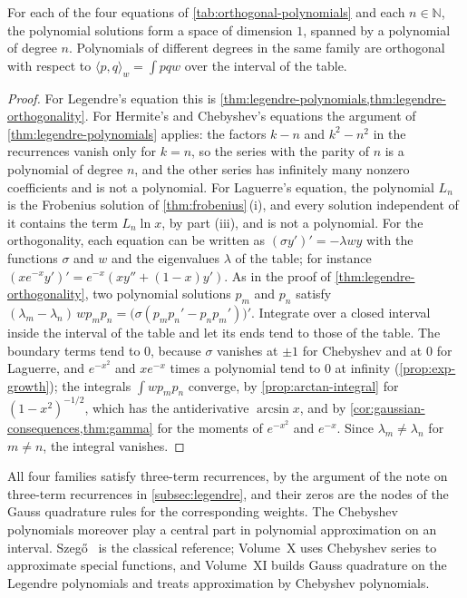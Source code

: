 \begin{proposition}
\label{prop:classical-polynomials}
For each of the four equations of \cref{tab:orthogonal-polynomials} and each $n\in\mathbb N$, the polynomial solutions form a space of dimension $1$, spanned by a polynomial of degree $n$. Polynomials of different degrees in the same family are orthogonal with respect to $\langle p,q\rangle_w=\int pqw$ over the interval of the table.
\end{proposition}

\begin{proof}
For Legendre's equation this is \cref{thm:legendre-polynomials,thm:legendre-orthogonality}. For Hermite's and Chebyshev's equations the argument of \cref{thm:legendre-polynomials} applies: the factors $k-n$ and $k^2-n^2$ in the recurrences vanish only for $k=n$, so the series with the parity of $n$ is a polynomial of degree $n$, and the other series has infinitely many nonzero coefficients and is not a polynomial. For Laguerre's equation, the polynomial $L_n$ is the Frobenius solution of \cref{thm:frobenius}\,(i), and every solution independent of it contains the term $L_n\ln x$, by part (iii), and is not a polynomial. For the orthogonality, each equation can be written as $(\sigma y')'=-\lambda wy$ with the functions $\sigma$ and $w$ and the eigenvalues $\lambda$ of the table; for instance $(xe^{-x}y')'=e^{-x}(xy''+(1-x)y')$. As in the proof of \cref{thm:legendre-orthogonality}, two polynomial solutions $p_m$ and $p_n$ satisfy $(\lambda_m-\lambda_n)\,wp_mp_n=\bigl(\sigma(p_mp_n'-p_np_m')\bigr)'$. Integrate over a closed interval inside the interval of the table and let its ends tend to those of the table. The boundary terms tend to $0$, because $\sigma$ vanishes at $\pm1$ for Chebyshev and at $0$ for Laguerre, and $e^{-x^2}$ and $xe^{-x}$ times a polynomial tend to $0$ at infinity (\cref{prop:exp-growth}); the integrals $\int wp_mp_n$ converge, by \cref{prop:arctan-integral} for $(1-x^2)^{-1/2}$, which has the antiderivative $\arcsin x$, and by \cref{cor:gaussian-consequences,thm:gamma} for the moments of $e^{-x^2}$ and $e^{-x}$. Since $\lambda_m\ne\lambda_n$ for $m\ne n$, the integral vanishes.
\end{proof}

All four families satisfy three-term recurrences, by the argument of the note on three-term recurrences in \cref{subsec:legendre}, and their zeros are the nodes of the Gauss quadrature rules for the corresponding weights. The Chebyshev polynomials moreover play a central part in polynomial approximation on an interval. Szeg\H{o}~\cite{szego1975} is the classical reference; Volume~X uses Chebyshev series to approximate special functions, and Volume~XI builds Gauss quadrature on the Legendre polynomials and treats approximation by Chebyshev polynomials.

